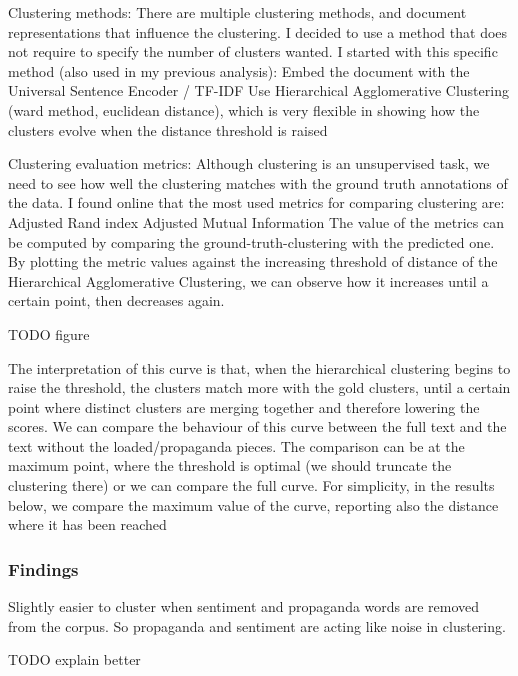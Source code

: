 Clustering methods:
There are multiple clustering methods, and document representations that influence the clustering. I decided to use a method that does not require to specify the number of clusters wanted.
I started with this specific method (also used in my previous analysis):
Embed the document with the Universal Sentence Encoder / TF-IDF
Use Hierarchical Agglomerative Clustering (ward method, euclidean distance), which  is very flexible in showing how the clusters evolve when the distance threshold is raised


Clustering evaluation metrics:
Although clustering is an unsupervised task, we need to see how well the clustering matches with the ground truth annotations of the data. I found online that the most used metrics for comparing clustering are:
Adjusted Rand index
Adjusted Mutual Information
The value of the metrics can be computed by comparing the ground-truth-clustering with the predicted one.
By plotting the metric values against the increasing threshold of distance of the Hierarchical Agglomerative Clustering, we can observe how it increases until a certain point, then decreases again.

TODO figure

The interpretation of this curve is that, when the hierarchical clustering begins to raise the threshold, the clusters match more with the gold clusters, until a certain point where distinct clusters are merging together and therefore lowering the scores.
We can compare the behaviour of this curve between the full text and the text without the loaded/propaganda pieces. The comparison can be at the maximum point, where the threshold is optimal (we should truncate the clustering there) or we can compare the full curve. For simplicity, in the results below, we compare the maximum value of the curve, reporting also the distance where it has been reached


\subsubsection{Findings}

Slightly easier to cluster when sentiment and propaganda words are removed from the corpus.
So propaganda and sentiment are acting like noise in clustering.

TODO explain better

